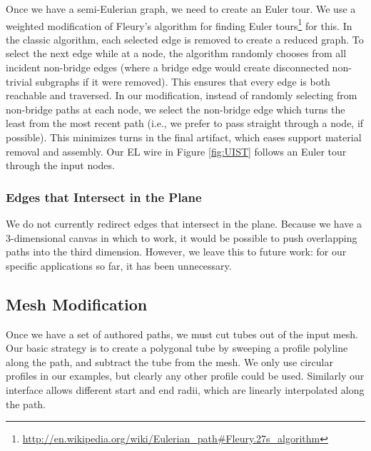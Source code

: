 Once we have a semi-Eulerian graph, we need to create an Euler tour.  We use a weighted modification of Fleury's algorithm for finding Euler tours\footnote{\url{http://en.wikipedia.org/wiki/Eulerian_path\#Fleury.27s_algorithm}} for this.  In the classic algorithm, each selected edge is removed to create a reduced graph.  To select the next edge while at a node, the algorithm randomly chooses from all incident non-bridge edges (where a bridge edge would create disconnected non-trivial subgraphs if it were removed).  This ensures that every edge is both reachable and traversed.  In our modification, instead of randomly selecting from non-bridge paths at each node, we select the non-bridge edge which turns the least from the most recent path (i.e., we prefer to pass straight through a node, if possible).  This minimizes turns in the final artifact, which eases support material removal and assembly.  Our EL wire in Figure \ref{fig:UIST} follows an Euler tour through the input nodes.

\subsubsection{Edges that Intersect in the Plane}
We do not currently redirect edges that intersect in the plane.  Because we have a 3-dimensional canvas in which to work, it would be possible to push overlapping paths into the third dimension.  However, we leave this to future work: for our specific applications so far, it has been unnecessary.

\subsection{Mesh Modification}

Once we have a set of authored paths, we must cut tubes out of the input mesh.
Our basic strategy is to create a polygonal tube by sweeping a profile polyline
along the path, and subtract the tube from the mesh. We only use circular profiles
in our examples, but clearly any other profile could be used. Similarly our interface
allows different start and end radii, which are linearly interpolated along the path.

